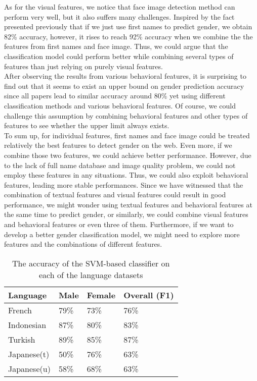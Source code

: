 \documentclass[runningheads]{llncs}
\begin{document}
	As for the visual features, we notice that face image detection method can perform very well, but it also suffers many challenges. Inspired by the fact presented previously that if we just use first names to predict gender, we obtain 82\% accuracy, however, it rises to reach 92\% accuracy when we combine the the features from first names and face image. Thus, we could argue that the classification model could perform better while combining several types of features than just relying on purely visual features. \\
	
	After observing the results from various behavioral features, it is surprising to find out that it seems to exist an upper bound on gender prediction accuracy since all papers lead to similar accuracy around 80\% yet using different classification methods and various behavioral features. Of course, we could challenge this assumption by combining behavioral features and other types of features to see whether the upper limit always exists. \\
	
	To sum up, for individual features, first names and face image could be treated relatively the best features to detect gender on the web. Even more, if we combine those two features, we could achieve better performance. However, due to the lack of full name database and image quality problem, we could not employ these features in any situations. Thus, we could also exploit behavioral features, leading more stable performances. Since we have witnessed that the combination of textual features and visual features could result in good performance, we might wonder using textual features and behavioral features at the same time to predict gender, or similarly, we could combine visual features and behavioral features or even three of them. Furthermore, if we want to develop a better gender classification model, we might need to explore more features and the combinations of different features.
	
	\begin{table}
		\centering
		\caption{The accuracy of the SVM-based classifier on each of the language datasets }
		\begin{tabular}{| x{2cm} | x{2cm} | x{2cm} | x{2cm} |}
			\hline
			Language  &  Male  & Female & Overall (F1)\\
			\hline
			French & 79\% & 73\% & 76\% \\
			Indonesian & 87\% & 80\% & 83\% \\
			Turkish & 89\% & 85\% & 87\% \\
			Japanese(t) & 50\% & 76\% & 63\% \\
			Japanese(u) & 58\% & 68\% & 63\% \\
			\hline
		\end{tabular}
		\label{table:language}
	\end{table}
	
	
	
	\newpage
	
	
	
	
\end{document}
